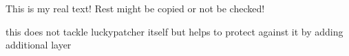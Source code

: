 This is my real text! Rest might be copied or not be checked!

this does not tackle luckypatcher itself but helps to protect against it by adding additional layer
